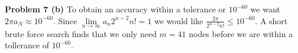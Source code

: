 \documentclass[12pt]{article}
\newcommand{\problem}[1]{\hspace{-4 ex} \large \textbf{Problem #1} }
\begin{document}
\bigbreak
\problem{7 (b)} To obtain an accuracy within a tolerance or $10^{-60}$ we want $2\pi a_N \approx 10^{-60}$. Since $\lim\limits_{n \to \infty}a_n 2^{n-2}n! = 1$ we would like $\frac{2\pi}{2^{n-2}n!} \leq 10^{-60}$. A short brute force search finds that we only need $m=41$ nodes before we are within a tollerance of $10^{-60}$.
\end{document}

